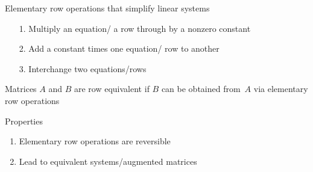 \documentclass%
[handout]%
{beamer}
\begin{document}

\begin{frame}[label=elem-row]{Elementary row operations that simplify linear systems}
 \begin{itemize}
   \item[1.] Multiply {\color{blue} an equation}/{\color{purple} a row} through by a nonzero constant
   \item[2.] Add a constant times one {\color{blue}equation}/{\color{purple} row} to another
   \item[3.] Interchange two {\color{blue} equations}/{\color{purple}rows}
 \end{itemize}

\begin{definition}
 Matrices $A$ and $B$ are \alert{row equivalent} if $B$ can be obtained from~$A$ via elementary row operations
\end{definition}

\begin{block}{Properties}
\begin{enumerate}
  \item Elementary row operations are reversible
  \item Lead to equivalent systems/augmented matrices
\end{enumerate}
\end{block}
\end{frame}

\end{document}
